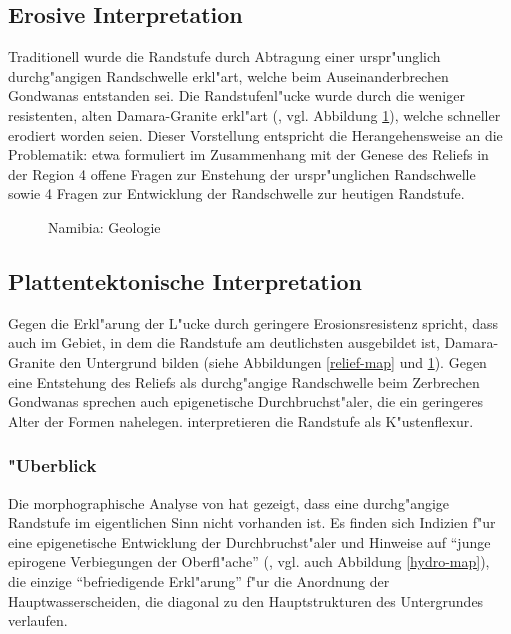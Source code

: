 \documentclass[titlepage,a4paper]{scrartcl}
\begin{document}
\subsection{Erosive Interpretation}

Traditionell wurde die Randstufe durch Abtragung einer urspr"unglich durchg"angigen Randschwelle erkl"art, welche beim Auseinanderbrechen Gondwanas entstanden sei. Die Randstufenl"ucke wurde durch die weniger resistenten, alten Damara-Granite erkl"art (\citealt{Hueser1989}, vgl. Abbildung \ref{gestein-map}), welche schneller erodiert worden seien. Dieser Vorstellung entspricht die Herangehensweise an die Problematik: \cite{Hueser1989} etwa formuliert im Zusammenhang mit der Genese des Reliefs in der Region 4 offene Fragen zur Enstehung der urspr"unglichen Randschwelle sowie 4 Fragen zur Entwicklung der Randschwelle zur heutigen Randstufe.

\begin{figure}
\begin{center}
\end{center}
\caption[Namibia: Geologie]{Namibia: Geologie }
\label{gestein-map}
\end{figure}

\subsection{Plattentektonische Interpretation} \label{tektonik}

Gegen die Erkl"arung der L"ucke durch geringere Erosionsresistenz spricht, dass auch im Gebiet, in dem die Randstufe am deutlichsten ausgebildet ist, Damara-Granite den Untergrund bilden (siehe Abbildungen \ref{relief-map} und \ref{gestein-map}). Gegen eine Entstehung des Reliefs als durchg"angige Randschwelle beim Zerbrechen Gondwanas sprechen auch epigenetische Durchbruchst"aler, die ein geringeres Alter der Formen nahelegen. \cite{BrunotteAndSpoenemann1997} interpretieren die Randstufe als K"ustenflexur.
 
 \subsubsection{"Uberblick}

Die morphographische Analyse von \cite{BrunotteAndSpoenemann1997} hat gezeigt, dass eine durchg"angige Randstufe im eigentlichen Sinn nicht vorhanden ist. Es finden sich Indizien f"ur eine epigenetische Entwicklung der Durchbruchst"aler und Hinweise auf ``junge epirogene Verbiegungen der Oberfl"ache'' (\citealt[5]{BrunotteAndSpoenemann1997}, vgl. auch Abbildung \ref{hydro-map}), die einzige ``befriedigende Erkl"arung'' \citep[11]{BrunotteAndSpoenemann1997}  f"ur die Anordnung der Hauptwasserscheiden, die diagonal zu den Hauptstrukturen des Untergrundes verlaufen.
\end{document}
